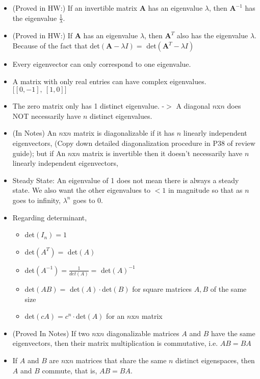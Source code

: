 \documentclass{article}
\begin{document}
\begin{itemize}
	\item (Proved in HW:) If an invertible matrix $\mathbf{A}$ has an eigenvalue $\lambda$, then $\mathbf{A}^{-1}$ has the eigenvalue $\frac{1}{\lambda}.$
	\item (Proved in HW:) If $\mathbf{A}$ has an eigenvalue $\lambda$, then $\mathbf{A}^T$ also has the eigenvalue $\lambda.$ Because of the fact that det$(\mathbf{A} - \lambda I) = $ det$(\mathbf{A}^T - \lambda I)$
	\item Every eigenvector can only correspond to one eigenvalue.
	\item A matrix with only real entries can have complex eigenvalues. $\big[[0, -1],\ [1, 0]\big]$
	\item The zero matrix only has 1 distinct eigenvalue. -$>$ A diagonal $n$x$n$ does NOT necessarily have $n$ distinct eigenvalues.
	\item (In Notes) An $n$x$n$ matrix is diagonalizable if it has $n$ linearly independent eigenvectors, (Copy down detailed diagonalization procedure in P38 of review guide); but if An $n$x$n$ matrix is invertible then it doesn't necessarily have $n$ linearly independent eigenvectors,
	\item {\color{red} Steady State:} An eigenvalue of 1 does not mean there is always a steady state. We also want the other eigenvalues to $<1$ in magnitude so that as $n$ goes to infinity, $\lambda^n$ goes to 0.
	\item Regarding determinant,
	\begin{itemize}
		\item det$(I_n) = 1$
		\item det$(A^T) = $ det$(A)$
		\item det$(A^{-1}) = \frac{1}{det(A)} = $ det$(A)^{-1}$
		\item det$(AB) = $ det$(A)\cdot$det$(B)$ for square matrices $A, B$ of the same size
		\item det$(cA) = c^n\cdot$det$(A)$ for an $n$x$n$ matrix
	\end{itemize}
	\item (Proved In Notes) If two $n$x$n$ diagonalizable matrices $A$ and $B$ have the same eigenvectors, then their matrix multiplication is commutative, i.e. $AB = BA$
	\item If $A$ and $B$ are $n$x$n$ matrices that share the same $n$ distinct eigenspaces, then $A$ and $B$ commute, that is, $AB = BA.$
\end{itemize}
\end{document}
